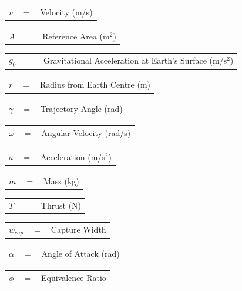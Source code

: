 \documentclass[journal]{new-aiaa}
\begin{document}
	  	\begin{tabular}{p{1.2cm}p{1cm}p{5cm}}
	  $v$ & $=$ & Velocity (m/s)\\
	  	\end{tabular} 
	  	\begin{tabular}{p{1.2cm}p{1cm}p{5cm}}
	  $A$ & $=$ & Reference Area (m$^2$)\\
	  	\end{tabular} 
	  	\begin{tabular}{p{1.2cm}p{1cm}p{5cm}}
	  		$g_0$ & $=$ & Gravitational Acceleration at Earth's Surface (m/s$^2$)\\
	  	\end{tabular} 
	  	\begin{tabular}{p{1.2cm}p{1cm}p{5cm}}

	
	$r$ & $=$ & Radius from Earth Centre (m)\\
		\end{tabular} 
		\begin{tabular}{p{1.2cm}p{1cm}p{5cm}}
	  $\gamma$ & $=$ & Trajectory Angle (rad)\\
	  	\end{tabular} 
	  	\begin{tabular}{p{1.2cm}p{1cm}p{5cm}}
	  $\omega$ & $=$ & Angular Velocity (rad/s)\\
	  	\end{tabular} 
	  	\begin{tabular}{p{1.2cm}p{1cm}p{5cm}}
	  $a$ & $=$ & Acceleration (m/s$^2$)\\
	  	\end{tabular} 
	  	\begin{tabular}{p{1.2cm}p{1cm}p{5cm}}
	  $m$ & $=$ & Mass (kg)\\
	  	\end{tabular} 
	  	\begin{tabular}{p{1.2cm}p{1cm}p{5cm}}
	  $T$ & $=$ & Thrust (N)\\
	  	\end{tabular} 
	  	\begin{tabular}{p{1.2cm}p{1cm}p{5cm}}
	  $w_{cap}$ & $=$ & Capture Width\\
	  	\end{tabular} 
	  	\begin{tabular}{p{1.2cm}p{1cm}p{5cm}}
	  		$\alpha$ & $=$ & Angle of Attack (rad)\\
	  	\end{tabular} 	
	  	\begin{tabular}{p{1.2cm}p{1cm}p{5cm}}
	  		$\phi$ & $=$ & Equivalence Ratio\\
	  	\end{tabular} 
\end{document}
